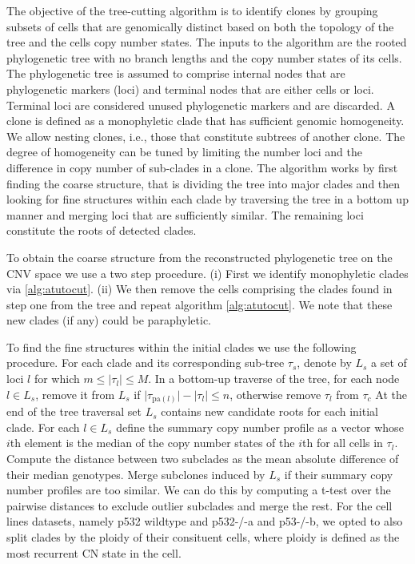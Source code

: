 \documentclass{article}
\begin{document}
The objective of the tree-cutting algorithm is to identify clones by grouping subsets of cells that are genomically distinct based on both the topology of the tree and the cells copy number states. 
The inputs to the algorithm are the rooted phylogenetic tree with no branch lengths and the copy number states of its cells.
The phylogenetic tree is assumed to comprise internal nodes that are phylogenetic markers (loci) and terminal nodes that are either cells or loci. 
Terminal loci are considered unused phylogenetic markers and are discarded. 
A clone is defined as a monophyletic clade that has sufficient genomic homogeneity. 
We allow nesting clones, i.e., those that constitute subtrees of another clone.
The degree of homogeneity can be tuned by limiting the number loci and the difference in copy number of sub-clades in a clone. 
The algorithm works by first finding the coarse structure, that is dividing the tree into major clades and then looking for fine structures within each clade by traversing the tree in a bottom up manner and merging loci that are sufficiently similar.
The remaining loci constitute the roots of detected clades.

To obtain the coarse structure from the reconstructed phylogenetic tree on the CNV space we use a two step procedure. (i) First we identify monophyletic clades via \ref{alg:atutocut}. 
(ii) We then remove the cells comprising the clades found in step one from the tree and repeat algorithm \ref{alg:atutocut}. 
We note that these new clades (if any) could be paraphyletic.

To find the fine structures within the initial clades we use the following procedure.
For each clade and its corresponding sub-tree $\tau_s$, denote by $L_s$ a set of loci $l$ for which $m \le \lvert \tau_l \rvert \le M$. 
In a bottom-up traverse of the tree, for each node $l \in L_s$, remove it from $L_s$ if $\lvert \tau_{\text{pa}(l)} \rvert - \lvert \tau_{l} \rvert \le n$, otherwise remove $\tau_{l}$ from $\tau_c$
At the end of the tree traversal set $L_s$ contains new candidate roots for each initial clade.
For each $l \in L_s$ define the summary copy number profile as a vector whose $i$th element is the median of the copy number states of the $i$th for all cells in $\tau_{l}$.
Compute the distance between two subclades as the mean absolute difference of their median genotypes.
Merge subclones induced by $L_s$ if their summary copy number profiles are too similar.
We can do this by computing a t-test over the pairwise distances to exclude outlier subclades and merge the rest.
For the cell lines datasets, namely p532 wildtype and p532-/-a and p53-/-b,  we opted to also split clades by the ploidy of their consituent cells, where ploidy is defined as the most recurrent CN state in the cell.  
\end{document}
